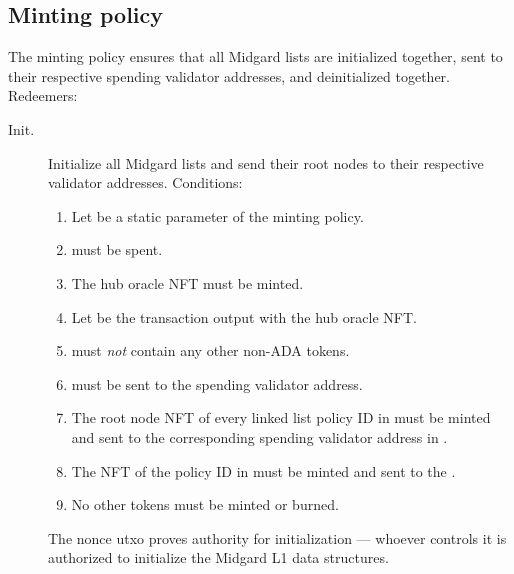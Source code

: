\documentclass[../midgard.tex]{subfiles}
\begin{document}
\todo

\subsection{Minting policy}
\label{h:hub-oracle-minting-policy}

The  minting policy ensures that all Midgard lists are initialized together, sent to their respective spending validator addresses, and deinitialized together.
Redeemers:
\begin{description}
    \item[Init.] Initialize all Midgard lists and send their root nodes to their respective validator addresses.
      Conditions:
        \begin{enumerate}
            \item Let  be a static parameter of the  minting policy.
            \item {} must be spent.
            \item The hub oracle NFT must be minted.
            \item Let  be the transaction output with the hub oracle NFT.
            \item {} must \emph{not} contain any other non-ADA tokens.
            \item {} must be sent to the  spending validator address.
            \item The root node NFT of every linked list policy ID in  must be minted and sent to the corresponding spending validator address in .
            \item The NFT of the  policy ID in  must be minted and sent to the .
            \item No other tokens must be minted or burned.
        \end{enumerate}
    The nonce utxo proves authority for initialization --- whoever controls it is authorized to initialize the Midgard L1 data structures.
    

\end{description}
\end{document}

